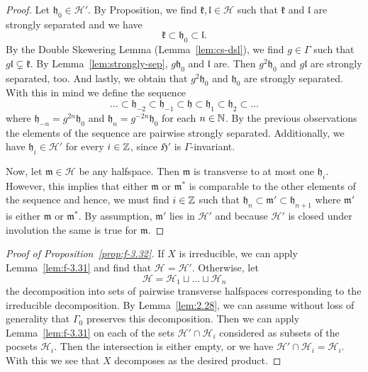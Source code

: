 \begin{proof}
  Let \(\mathfrak{h}_0 \in \mathcal{H}'\). By Proposition, we find \(\mathfrak{k}, \mathfrak{l} \in \mathcal{H}\) such that \(\mathfrak{k}\) and \(\mathfrak{l}\) are strongly separated and we have
  \[
    \mathfrak{k} \subset \mathfrak{h}_0 \subset \mathfrak{l}.
  \]
  By the Double Skewering Lemma (Lemma~\ref{lem:cs-dsl}), we find \(g \in \Gamma\) such that \(g\mathfrak{l} \subsetneq \mathfrak{k}\). By Lemma~\ref{lem:strongly-sep}, \(g\mathfrak{h}_0\) and \(\mathfrak{l}\) are. Then \(g^2\mathfrak{h}_0\) and \(g\mathfrak{l}\) are strongly separated, too. And lastly, we obtain that \(g^2\mathfrak{h}_0\) and \(\mathfrak{h}_0\) are strongly separated. With this in mind we define the sequence
  \[
    \dots \subset \mathfrak{h}_{-2} \subset \mathfrak{h}_{-1} \subset \mathfrak{h} \subset \mathfrak{h}_1 \subset \mathfrak{h}_2 \subset \dots
  \]
  where \(\mathfrak{h}_{-n} = g^{2n}\mathfrak{h}_0\) and \(\mathfrak{h}_n = g^{-2n}\mathfrak{h}_0\) for each \(n \in \mathbb{N}\). By the previous observations the elements of the sequence are pairwise strongly separated. Additionally, we have \(\mathfrak{h}_i \in \mathcal{H}'\) for every \(i \in \mathbb{Z}\), since \(\mathfrak{H}'\) is \(\Gamma\)-invariant.

  Now, let \(\mathfrak{m} \in \mathcal{H}\) be any halfspace. Then \(\mathfrak{m}\) is transverse to at most one \(\mathfrak{h}_i\). However, this implies that either \(\mathfrak{m}\) or \(\mathfrak{m}^\ast\) is comparable to the other elements of the sequence and hence, we must find \(i \in \mathbb{Z}\) such that \(\mathfrak{h}_n \subset \mathfrak{m}' \subset \mathfrak{h}_{n+1}\) where \(\mathfrak{m}'\) is either \(\mathfrak{m}\) or \(\mathfrak{m}^\ast\). By assumption, \(\mathfrak{m}'\) lies in \(\mathcal{H}'\) and because \(\mathcal{H}'\) is closed under involution the same is true for \(\mathfrak{m}\).
\end{proof}

\begin{proof}[Proof of Proposition~\ref{prop:f-3.32}]
  If \(X\) is irreducible, we can apply Lemma~\ref{lem:f-3.31} and find that \(\mathcal{H} = \mathcal{H}'\). Otherwise, let
  \[
    \mathcal{H} = \mathcal{H}_1 \sqcup \dots \sqcup \mathcal{H}_n
  \]
  the decomposition into sets of pairwise transverse halfspaces corresponding to the irreducible decomposition. By Lemma~\ref{lem:2.28}, we can assume without loss of generality that \(\Gamma_0\) preserves this decomposition. Then we can apply Lemma~\ref{lem:f-3.31} on each of the sets \(\mathcal{H}' \cap \mathcal{H}_i\) considered as subsets of the pocsets \(\mathcal{H}_i\). Then the intersection is either empty, or we have \(\mathcal{H}' \cap \mathcal{H}_i = \mathcal{H}_i\). With this we see that \(X\) decomposes as the desired product.
\end{proof}

